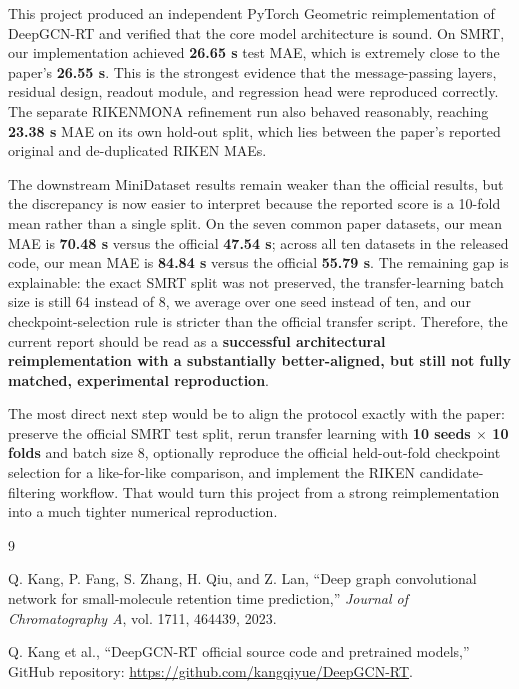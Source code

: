 This project produced an independent PyTorch Geometric reimplementation of DeepGCN-RT and verified that the core model architecture is sound. On SMRT, our implementation achieved \textbf{26.65 s} test MAE, which is extremely close to the paper's \textbf{26.55 s}. This is the strongest evidence that the message-passing layers, residual design, readout module, and regression head were reproduced correctly. The separate RIKENMONA refinement run also behaved reasonably, reaching \textbf{23.38 s} MAE on its own hold-out split, which lies between the paper's reported original and de-duplicated RIKEN MAEs.

The downstream MiniDataset results remain weaker than the official results, but the discrepancy is now easier to interpret because the reported score is a 10-fold mean rather than a single split. On the seven common paper datasets, our mean MAE is \textbf{70.48 s} versus the official \textbf{47.54 s}; across all ten datasets in the released code, our mean MAE is \textbf{84.84 s} versus the official \textbf{55.79 s}. The remaining gap is explainable: the exact SMRT split was not preserved, the transfer-learning batch size is still 64 instead of 8, we average over one seed instead of ten, and our checkpoint-selection rule is stricter than the official transfer script. Therefore, the current report should be read as a \textbf{successful architectural reimplementation with a substantially better-aligned, but still not fully matched, experimental reproduction}.

The most direct next step would be to align the protocol exactly with the paper: preserve the official SMRT test split, rerun transfer learning with \textbf{10 seeds \(\times\) 10 folds} and batch size 8, optionally reproduce the official held-out-fold checkpoint selection for a like-for-like comparison, and implement the RIKEN candidate-filtering workflow. That would turn this project from a strong reimplementation into a much tighter numerical reproduction.

\begin{thebibliography}{9}

Q. Kang, P. Fang, S. Zhang, H. Qiu, and Z. Lan,
\newblock ``Deep graph convolutional network for small-molecule retention time prediction,''
\newblock \emph{Journal of Chromatography A}, vol. 1711, 464439, 2023.

Q. Kang et al.,
\newblock ``DeepGCN-RT official source code and pretrained models,''
\newblock GitHub repository: \url{https://github.com/kangqiyue/DeepGCN-RT}.

\end{thebibliography}
